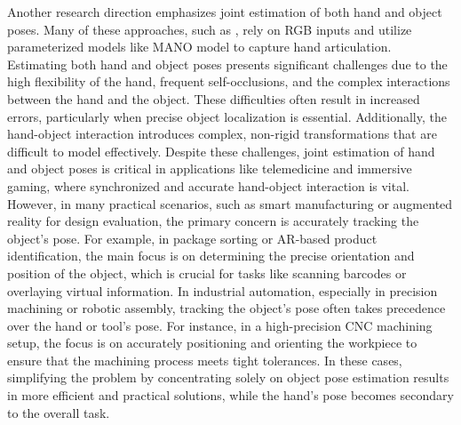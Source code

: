 Another research direction emphasizes joint estimation of both hand and object poses. Many of these approaches, such as \cite{doosti2020hope, lin2023harmonious, wang2023interacting}, rely on RGB inputs and utilize parameterized models like MANO \cite{romero2022embodied} model to capture hand articulation. Estimating both hand and object poses presents significant challenges due to the high flexibility of the hand, frequent self-occlusions, and the complex interactions between the hand and the object. These difficulties often result in increased errors, particularly when precise object localization is essential. Additionally, the hand-object interaction introduces complex, non-rigid transformations that are difficult to model effectively. Despite these challenges, joint estimation of hand and object poses is critical in applications like telemedicine and immersive gaming, where synchronized and accurate hand-object interaction is vital. However, in many practical scenarios, such as smart manufacturing or augmented reality for design evaluation, the primary concern is accurately tracking the object's pose. For example, in package sorting or AR-based product identification, the main focus is on determining the precise orientation and position of the object, which is crucial for tasks like scanning barcodes or overlaying virtual information. In industrial automation, especially in precision machining or robotic assembly, tracking the object's pose often takes precedence over the hand or tool's pose. For instance, in a high-precision CNC machining setup, the focus is on accurately positioning and orienting the workpiece to ensure that the machining process meets tight tolerances. In these cases, simplifying the problem by concentrating solely on object pose estimation results in more efficient and practical solutions, while the hand's pose becomes secondary to the overall task.

